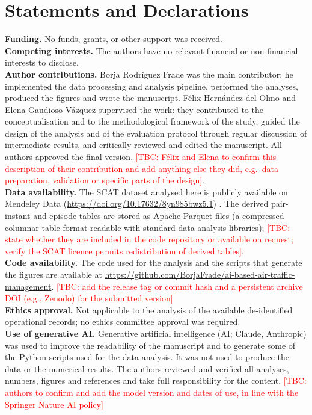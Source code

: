 \documentclass[pdflatex,sn-mathphys-num]{sn-jnl}
\newcommand{\tbc}[1]{\textcolor{red}{[TBC: #1]}}
\begin{document}
\section*{Statements and Declarations}
\noindent\textbf{Funding.} No funds, grants, or other support was received.\\
\textbf{Competing interests.} The authors have no relevant financial or non-financial interests to disclose.\\
\textbf{Author contributions.} Borja Rodríguez Frade was the main contributor: he implemented the data processing and analysis pipeline, performed the analyses, produced the figures and wrote the manuscript. Félix Hernández del Olmo and Elena Gaudioso Vázquez supervised the work: they contributed to the conceptualisation and to the methodological framework of the study, guided the design of the analysis and of the evaluation protocol through regular discussion of intermediate results, and critically reviewed and edited the manuscript. All authors approved the final version. \tbc{Félix and Elena to confirm this description of their contribution and add anything else they did, e.g.\ data preparation, validation or specific parts of the design}.\\
\textbf{Data availability.} The SCAT dataset analysed here is publicly available on Mendeley Data (\url{https://doi.org/10.17632/8yn985bwz5.1}) \cite{nilsson2023}. The derived pair-instant and episode tables are stored as Apache Parquet files (a compressed columnar table format readable with standard data-analysis libraries); \tbc{state whether they are included in the code repository or available on request; verify the SCAT licence permits redistribution of derived tables}.\\
\textbf{Code availability.} The code used for the analysis and the scripts that generate the figures are available at \url{https://github.com/BorjaFrade/ai-based-air-traffic-management}. \tbc{add the release tag or commit hash and a persistent archive DOI (e.g., Zenodo) for the submitted version}\\
\textbf{Ethics approval.} Not applicable to the analysis of the available de-identified operational records; no ethics committee approval was required.\\
\textbf{Use of generative AI.} Generative artificial intelligence (AI; Claude, Anthropic) was used to improve the readability of the manuscript and to generate some of the Python scripts used for the data analysis. It was not used to produce the data or the numerical results. The authors reviewed and verified all analyses, numbers, figures and references and take full responsibility for the content. \tbc{authors to confirm and add the model version and dates of use, in line with the Springer Nature AI policy}
\end{document}
